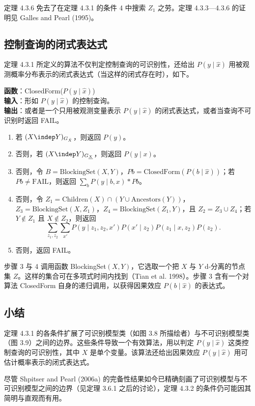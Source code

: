 定理 4.3.6 免去了在定理 4.3.1 的条件 4 中搜索 $Z_1$ 之劳。定理 4.3.3—4.3.6 的证明见 Galles and Pearl (1995)。

\subsection{控制查询的闭式表达式}

定理 4.3.1 所定义的算法不仅判定控制查询的可识别性，还给出 $P(y\mid\hat{x})$ 用被观测概率分布表示的闭式表达式（当这样的闭式存在时），如下。

\begin{techpoint}[ClosedForm 算法]
\textbf{函数}：ClosedForm($P(y\mid\hat{x})$)\\
\textbf{输入}：形如 $P(y\mid\hat{x})$ 的控制查询。\\
\textbf{输出}：或者是一个只用被观测变量表示 $P(y\mid\hat{x})$ 的闭式表达式，或者当查询不可识别时返回 FAIL。
\begin{enumerate}[label=\arabic*.,leftmargin=1.8em]
\item 若 $(X\indep Y)_{G_{\bar{X}}}$，则返回 $P(y)$。
\item 否则，若 $(X\indep Y)_{G_{\underline{X}}}$，则返回 $P(y\mid x)$。
\item 否则，令 $B=\mathrm{BlockingSet}(X,Y)$，$Pb=\mathrm{ClosedForm}(P(b\mid\hat{x}))$；若 $Pb\neq\mathrm{FAIL}$，则返回 $\sum_b P(y\mid b,x)*Pb$。
\item 否则，令 $Z_1=\mathrm{Children}(X)\cap(Y\cup\mathrm{Ancestors}(Y))$，$Z_3=\mathrm{BlockingSet}(X,Z_1)$，$Z_4=\mathrm{BlockingSet}(Z_1,Y)$，且 $Z_2=Z_3\cup Z_4$；若 $Y\notin Z_1$ 且 $X\notin Z_2$，则返回
\[
\sum_{z_1,z_2}\sum_{x'}P(y\mid z_1,z_2,x')P(x'\mid z_2)P(z_1\mid x,z_2)P(z_2).
\]
\item 否则，返回 FAIL。
\end{enumerate}
\end{techpoint}

步骤 3 与 4 调用函数 BlockingSet$(X,Y)$，它选取一个把 $X$ 与 $Y$ d-分离的节点集 $Z$。这样的集合可在多项式时间内找到（Tian et al. 1998）。步骤 3 含有一个对算法 ClosedForm 自身的递归调用，以获得因果效应 $P(b\mid\hat{x})$ 的表达式。

\subsection{小结}

定理 4.3.1 的各条件扩展了可识别模型类（如图 3.8 所描绘者）与不可识别模型类（图 3.9）之间的边界。这些条件导致一个有效算法，用以判定 $P(y\mid\hat{x})$ 这类控制查询的可识别性，其中 $X$ 是单个变量。该算法还给出因果效应 $P(y\mid\hat{x})$ 用可估计概率表示的闭式表达式。

尽管 Shpitser and Pearl (2006a) 的完备性结果如今已精确刻画了可识别模型与不可识别模型之间的边界（见定理 3.6.1 之后的讨论），定理 4.3.2 的条件仍可能因其简明与直观而有用。
